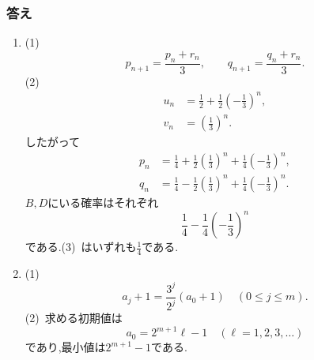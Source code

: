 \subsubsection{答え}\label{節：発展：答え}
\begin{enumerate}[label=\textbf{問\arabic*.},leftmargin=3.8em,format=\bookitemlink{practice-entrance}{answer}{solution}]
  \item (1)~
    \[
      p_{n+1}=\frac{p_n+r_n}{3},\qquad
      q_{n+1}=\frac{q_n+r_n}{3}.
    \]
    (2)~
    \[
      \begin{aligned}
        u_n&=\frac12+\frac12\left(-\frac13\right)^n,\\
        v_n&=\left(\frac13\right)^n.
      \end{aligned}
    \]
    したがって
    \[
      \begin{aligned}
        p_n&=\frac14+\frac12\left(\frac13\right)^n
        +\frac14\left(-\frac13\right)^n,\\
        q_n&=\frac14-\frac12\left(\frac13\right)^n
        +\frac14\left(-\frac13\right)^n.
      \end{aligned}
    \]
    $B,D$にいる確率はそれぞれ
    \[
      \frac14-\frac14\left(-\frac13\right)^n
    \]
    である.(3)~はいずれも$\frac14$である.
  \item (1)~
    \[
      a_j+1=\frac{3^j}{2^j}(a_0+1)
      \quad(0\le j\le m).
    \]
    (2)~求める初期値は
    \[
      a_0=2^{m+1}\ell-1
      \quad(\ell=1,2,3,\ldots)
    \]
    であり,最小値は$2^{m+1}-1$である.


\end{enumerate}
